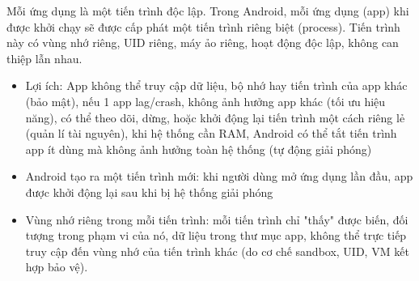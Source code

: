 \renewcommand{\labelitemi}{--} 
        \vspace{0.5em}  
        Mỗi ứng dụng là một tiến trình độc lập. Trong Android, mỗi ứng dụng (app) khi được khởi chạy sẽ được cấp phát một tiến trình riêng biệt (process). Tiến trình này có vùng nhớ riêng, UID riêng, máy ảo riêng, hoạt động độc lập, không can thiệp lẫn nhau.
      \setlength{\leftmargini}{1.5cm}
      \begin{itemize}
        \item Lợi ích: App không thể truy cập dữ liệu, bộ nhớ hay tiến trình của app khác (bảo mật), nếu 1 app lag/crash, không ảnh hưởng app khác (tối ưu hiệu năng), có thể theo dõi, dừng, hoặc khởi động lại tiến trình một cách riêng lẻ (quản lí tài nguyên), khi hệ thống cần RAM, Android có thể tắt tiến trình app ít dùng mà không ảnh hưởng toàn hệ thống (tự động giải phóng)
        \item Android tạo ra một tiến trình mới: khi người dùng mở ứng dụng lần đầu, app được khởi động lại sau khi bị hệ thống giải phóng
        \item Vùng nhớ riêng trong mỗi tiến trình: mỗi tiến trình chỉ "thấy" được biến, đối tượng trong phạm vi của nó, dữ liệu trong thư mục app, không thể trực tiếp truy cập đến vùng nhớ của tiến trình khác (do cơ chế sandbox, UID, VM kết hợp bảo vệ).
      \end{itemize}
